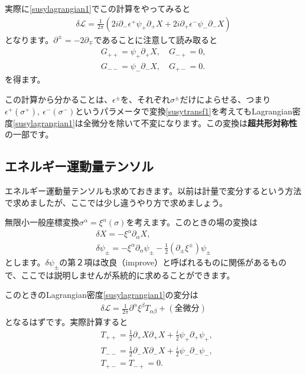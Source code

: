 \documentclass[report,paper=a4, fontsize=12pt, line_length=16cm, number_of_lines=33,dvipdfmx]{jlreq}
\numberwithin{equation}{chapter}
\numberwithin{equation}{section}
\newcommand{\del}{\partial}
\newcommand{\kyou}[1]{{\sffamily \bfseries #1}}
\newcommand{\Lcal}{\mathcal{L}}
\begin{document}
実際に\eqref{susylagrangian1}でこの計算をやってみると
\begin{align}
  \delta \Lcal = \frac{1}{2\pi}
  \left( 
    2i\del_{-}\epsilon^{+} \psi_{+}\del_{+}X +2i \del_{+}\epsilon^{-}\psi_{-}\del_{-}X
   \right)
\end{align}
となります。$\del^{\pm}=-2\del_{\mp}$であることに注意して読み取ると
\begin{align}
  G_{++}=\psi_{+}\del_{+}X,\quad G_{-+}=0,\nonumber\\
  G_{--}=\psi_{-}\del_{-}X,\quad G_{+-}=0.
\label{SUSYcurrent1}
\end{align}
を得ます。

この計算から分かることは、$\epsilon^{\pm}$を、それぞれ$\sigma^{\pm}$だけによらせる、つまり$\epsilon^{+}(\sigma^{+}),\ \epsilon^{-}(\sigma^{-})$というパラメータで変換\eqref{susytransf1}を考えてもLagrangian密度\eqref{susylagrangian1}は全微分を除いて不変になります。この変換は\kyou{超共形対称性}の一部です。

\subsection{エネルギー運動量テンソル}
エネルギー運動量テンソルも求めておきます。以前は計量で変分するという方法で求めましたが、ここでは少し違うやり方で求めましょう。

無限小一般座標変換$\sigma^{\alpha}=\xi^{\alpha}(\sigma)$を考えます。このときの場の変換は
\begin{align}
  \delta X=-\xi^{\alpha}\del_{\alpha}X,\\
  \delta \psi_{\pm}=-\xi^{\alpha}\del_{\alpha}\psi_{\pm}-\frac12(\del_{\pm}\xi^{\pm})\psi_{\pm}\label{susyconformaltransf}
\end{align}
とします。$\delta \psi_{\pm}$の第２項は改良（improve）と呼ばれるものに関係があるもので、ここでは説明しませんが系統的に求めることができます。

このときのLagrangian密度\eqref{susylagrangian1}の変分は
\begin{align}
  \delta \Lcal = \frac{1}{2\pi}\del^{\alpha}\xi^{\beta}T_{\alpha\beta}+(\text{全微分})
\end{align}
となるはずです。実際計算すると
\begin{align}
  &T_{++}=\frac12\del_{+}X\del_{+}X+\frac{i}{2}\psi_{+}\del_{+}\psi_{+},\nonumber\\
  &T_{--}=\frac12\del_{-}X\del_{-}X+\frac{i}{2}\psi_{-}\del_{-}\psi_{-},\nonumber\\
  &T_{+-}=T_{-+}=0.\label{EMtensorSUSYsystem}
\end{align}
\end{document}
